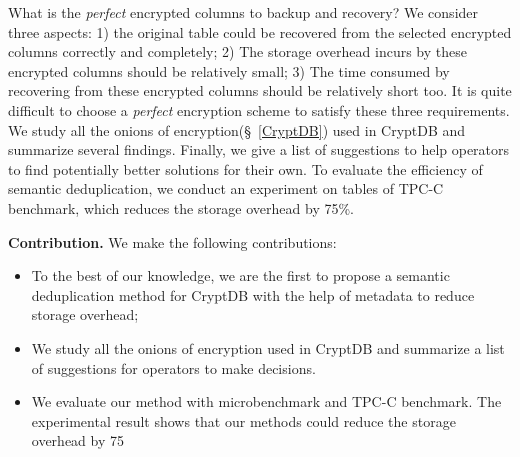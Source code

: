 What is the \textit{perfect} encrypted columns to backup and recovery? We consider three aspects: 1) the original table could be recovered from the selected encrypted columns correctly and completely; 2) The storage overhead incurs by these encrypted columns should be relatively small; 3) The time consumed by recovering from these encrypted columns should be relatively short too. It is quite difficult to choose a \textit{perfect} encryption scheme to satisfy these three requirements. We study all the onions of encryption(\S~\ref{CryptDB}) used in CryptDB and summarize several findings. Finally, we give a list of suggestions to help operators to find potentially better solutions for their own. To evaluate the efficiency of semantic deduplication, we conduct an experiment on tables of TPC-C benchmark, which reduces the storage overhead by 75\%.

\textbf{Contribution.} We make the following contributions:
\begin{itemize}
\item To the best of our knowledge, we are the first to propose a semantic deduplication method for CryptDB with the help of metadata to reduce storage overhead;
\item We study all the onions of encryption used in CryptDB and summarize a list of suggestions for operators to make decisions.
\item We evaluate our method with microbenchmark and TPC-C benchmark. The experimental result shows that our methods could reduce the storage overhead by 75%
\end{itemize}






